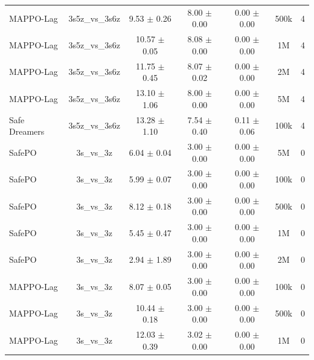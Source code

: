 \documentclass{article}
\begin{document}
\begin{longtable}{lcccccc}
MAPPO-Lag & 3s5z\_vs\_3s6z & \textcolor{green!60!black}{9.53 $\pm$ 0.26} & \textcolor{green!60!black}{8.00 $\pm$ 0.00} & \textcolor{green!60!black}{0.00 $\pm$ 0.00} & 500k & 4 \\
MAPPO-Lag & 3s5z\_vs\_3s6z & \textcolor{green!60!black}{10.57 $\pm$ 0.05} & \textcolor{green!60!black}{8.08 $\pm$ 0.00} & \textcolor{green!60!black}{0.00 $\pm$ 0.00} & 1M & 4 \\
MAPPO-Lag & 3s5z\_vs\_3s6z & \textcolor{green!60!black}{11.75 $\pm$ 0.45} & \textcolor{green!60!black}{8.07 $\pm$ 0.02} & \textcolor{green!60!black}{0.00 $\pm$ 0.00} & 2M & 4 \\
MAPPO-Lag & 3s5z\_vs\_3s6z & \textcolor{green!60!black}{13.10 $\pm$ 1.06} & \textcolor{green!60!black}{8.00 $\pm$ 0.00} & \textcolor{green!60!black}{0.00 $\pm$ 0.00} & 5M & 4 \\
Safe Dreamers & 3s5z\_vs\_3s6z & 13.28 $\pm$ 1.10 & 7.54 $\pm$ 0.40 & 0.11 $\pm$ 0.06 & 100k & 4 \\
\midrule
SafePO & 3s\_vs\_3z & \textcolor{green!60!black}{6.04 $\pm$ 0.04} & \textcolor{green!60!black}{3.00 $\pm$ 0.00} & \textcolor{green!60!black}{0.00 $\pm$ 0.00} & 5M & 0 \\
SafePO & 3s\_vs\_3z & \textcolor{green!60!black}{5.99 $\pm$ 0.07} & \textcolor{green!60!black}{3.00 $\pm$ 0.00} & \textcolor{green!60!black}{0.00 $\pm$ 0.00} & 100k & 0 \\
SafePO & 3s\_vs\_3z & \textcolor{green!60!black}{8.12 $\pm$ 0.18} & \textcolor{green!60!black}{3.00 $\pm$ 0.00} & \textcolor{green!60!black}{0.00 $\pm$ 0.00} & 500k & 0 \\
SafePO & 3s\_vs\_3z & \textcolor{green!60!black}{5.45 $\pm$ 0.47} & \textcolor{green!60!black}{3.00 $\pm$ 0.00} & \textcolor{green!60!black}{0.00 $\pm$ 0.00} & 1M & 0 \\
SafePO & 3s\_vs\_3z & \textcolor{green!60!black}{2.94 $\pm$ 1.89} & \textcolor{green!60!black}{3.00 $\pm$ 0.00} & \textcolor{green!60!black}{0.00 $\pm$ 0.00} & 2M & 0 \\
MAPPO-Lag & 3s\_vs\_3z & \textcolor{green!60!black}{8.07 $\pm$ 0.05} & \textcolor{green!60!black}{3.00 $\pm$ 0.00} & \textcolor{green!60!black}{0.00 $\pm$ 0.00} & 100k & 0 \\
MAPPO-Lag & 3s\_vs\_3z & \textcolor{green!60!black}{10.44 $\pm$ 0.18} & \textcolor{green!60!black}{3.00 $\pm$ 0.00} & \textcolor{green!60!black}{0.00 $\pm$ 0.00} & 500k & 0 \\
MAPPO-Lag & 3s\_vs\_3z & \textcolor{green!60!black}{12.03 $\pm$ 0.39} & \textcolor{green!60!black}{3.02 $\pm$ 0.00} & \textcolor{green!60!black}{0.00 $\pm$ 0.00} & 1M & 0 \\

\end{longtable}
\end{document}
